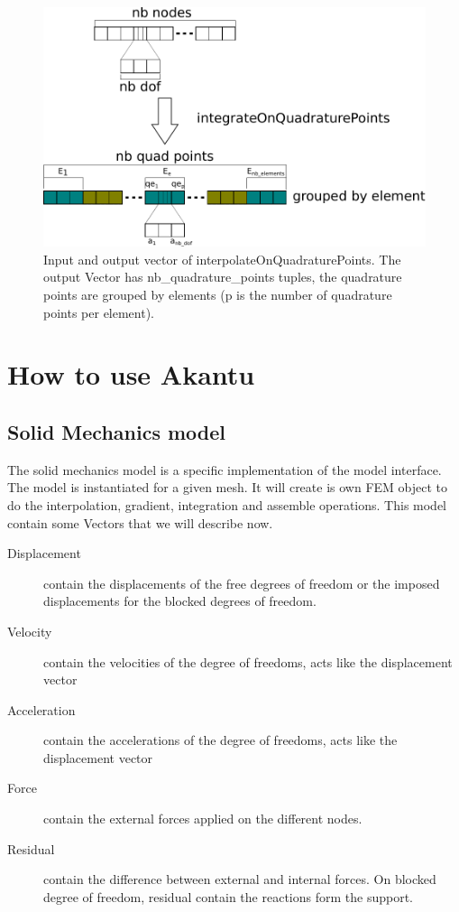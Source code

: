 \documentclass[a4paper,11pt]{book}
\begin{document}
\begin{figure}[!htb]
  \centering
  \includegraphics[width=\textwidth]{figures/interpolate}
  \caption{Input and output  vector of interpolateOnQuadraturePoints. The output
    Vector has nb\_quadrature\_points tuples,  the quadrature points are grouped
    by elements (p is the number of quadrature points per element).}
  \label{fig:interpolate-storage}
\end{figure}


\chapter{How to use Akantu}

\section{Solid Mechanics model}

The  solid  mechanics  model  is   a  specific  implementation  of  the  model
interface. The model is instantiated for a given mesh. It will create is own FEM
object   to   do  the   interpolation,   gradient,   integration  and   assemble
operations. This model contain some Vectors that we will describe now.

\begin{description}
\item[Displacement] contain the displacements of  the free degrees of freedom or
  the imposed displacements for the blocked degrees of freedom.
\item[Velocity] contain the velocities of  the degree of freedoms, acts like the
  displacement vector
\item[Acceleration] contain  the accelerations of  the degree of  freedoms, acts
  like the displacement vector
\item[Force] contain the external forces applied on the different nodes.
\item[Residual] contain the difference  between external and internal forces. On
  blocked degree of freedom, residual contain the reactions form the support.
\end{description}
\end{document}
